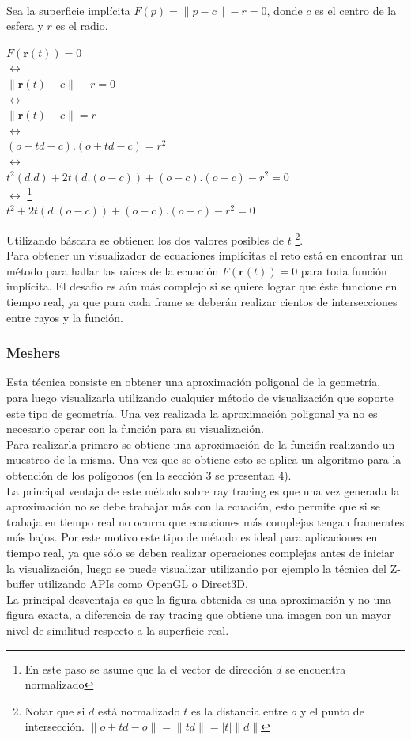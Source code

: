\documentclass[12pt]{article}
\begin{document}
\\Sea la superficie implícita $F(p)=\lVert p -c \rVert - r = 0$, donde $c$ es el centro de la esfera y $r$ es el radio.
\begin{center}
$ F(\textbf{r}(t))= 0$
\\$ \leftrightarrow$
\\$ \lVert \textbf{r}(t) -c \rVert - r = 0$
\\$ \leftrightarrow$
\\$ \lVert \textbf{r}(t) -c \rVert = r$
\\ $\leftrightarrow$
\\ $(o+td -c).(o+td -c) = r^2 $ 
\\ $\leftrightarrow$
\\$t^2(d.d) + 2t(d.(o-c)) + (o-c).(o-c) - r^2=0$
\\ $\leftrightarrow$ \footnote{En este paso se asume que la el vector de dirección $d$ se encuentra normalizado}
\\$t^2 + 2t(d.(o-c)) + (o-c).(o-c) - r^2=0$
\end{center}
Utilizando báscara se obtienen los dos valores posibles de $t$ \footnote{Notar que si $d$ está normalizado $t$ es la distancia entre $o$ y el punto de intersección. $\lVert o + td - o \rVert = \lVert td\rVert = |t|\lVert d \rVert$}.
\\Para obtener un visualizador de ecuaciones implícitas el reto está en encontrar un método para hallar las raíces de la ecuación $F(\textbf{r}(t))=0$ para toda función implícita. El desafío es aún más complejo si se quiere lograr que éste funcione en tiempo real, ya que para cada frame se deberán realizar cientos de intersecciones entre rayos y la función.  
\subsubsection{Meshers}
Esta técnica consiste en obtener una aproximación poligonal de la geometría, para luego visualizarla utilizando cualquier método de visualización que soporte este tipo de geometría. Una vez realizada la aproximación poligonal ya no es necesario operar con la función para su visualización.
\\Para realizarla primero se obtiene una aproximación de la función realizando un muestreo de la misma. Una vez que se obtiene esto se aplica un algoritmo para la obtención de los polígonos (en la sección 3 se presentan 4)\cite{mykola1}\cite{mykola2}.
\\La principal ventaja de este método sobre ray tracing es que una vez generada la aproximación no se debe trabajar más con la ecuación, esto permite que si se trabaja en tiempo real no ocurra que ecuaciones más complejas tengan framerates más bajos. Por este motivo este tipo de método es ideal para aplicaciones en tiempo real, ya que sólo se deben realizar operaciones complejas antes de iniciar la visualización, luego se puede visualizar utilizando por ejemplo la técnica del Z-buffer utilizando APIs como OpenGL o Direct3D.
\\La principal desventaja es que la figura obtenida es una aproximación y no una figura exacta, a diferencia de ray tracing que obtiene una imagen con un mayor nivel de similitud respecto a la superficie real\cite{realtimerendering}.
\end{document}
